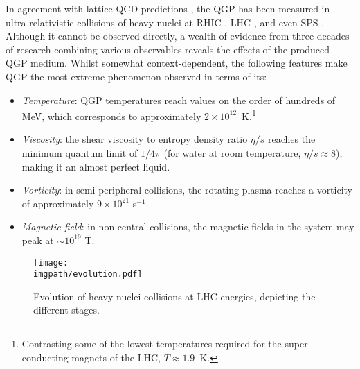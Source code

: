 In agreement with lattice QCD predictions \cite{borsanyiThermodynamicsQCDTransition2013}, the QGP has been measured in ultra-relativistic collisions of heavy nuclei at RHIC \cite{arseneQuarkGluonPlasma2005, adamsExperimentalTheoreticalChallenges2005}, LHC \cite{niidaSignaturesQGPRHIC2021}, and even SPS \cite{heinzEvidenceNewState2000}. Although it cannot be observed directly, a wealth of evidence from three decades of research combining various observables reveals the effects of the produced QGP medium. Whilst somewhat context-dependent, the following features make QGP the most extreme phenomenon observed in terms of its:
\begin{itemize}
\item \textit{Temperature}: QGP temperatures reach values on the order of hundreds of MeV, which corresponds to approximately $2 \times 10^{12}$~K.\footnote{Contrasting some of the lowest temperatures required for the super-conducting magnets of the LHC, $T \approx 1.9$~K.} \cite{cmscollaborationMeasurementNuclearModification2019}
\item \textit{Viscosity}: the shear viscosity to entropy density ratio $\eta/s$ reaches the minimum quantum limit of $1/4\pi$ (for water at room temperature, $\eta/s \approx 8$), making it an almost perfect liquid. \cite{pasechnikPhenomenologicalReviewQuark2017}
\item \textit{Vorticity}: in semi-peripheral collisions, the rotating plasma reaches a vorticity of approximately $9\times 10^{21}$ s$^{-1}$. \cite{adamczykGlobalHyperonPolarization2017}
\item \textit{Magnetic field}: in non-central collisions, the magnetic fields in the system may peak at $\sim 10^{19}$ T. \cite{kharzeevEffectsTopologicalCharge2008}
\end{itemize}

\begin{figure}[H]
\texttt{[image: \\imgpath/evolution.pdf]}\\
\caption{Evolution of heavy nuclei collisions at LHC energies, depicting the different stages. \cite{alicecollaborationALICEExperimentJourney2022}}
\label{fig:colls:evolution}
\end{figure}

